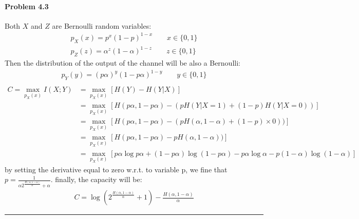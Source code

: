 \documentclass[12pt, letterpaper]{scrartcl}
\begin{document}
\paragraph*{Problem 4.3} \hfill\newline
Both $X$ and $Z$ are Bernoulli random variables:
\begin{align*}
    p_{X}(x)=p^x(1-p)^{1-x}\qquad x\in\{0,1\}\\
    p_{Z}(z)=\alpha^z(1-\alpha)^{1-z}\qquad z\in\{0,1\}
\end{align*}
Then the distribution of the output of the channel will be also a Bernoulli:
\begin{align*}
    p_{Y}(y)=(p\alpha)^y(1-p\alpha)^{1-y}\qquad y\in\{0,1\}\\
\end{align*}
\begin{align*}
    C=\max_{p_{X}(x)} I(X;Y)&=\max_{p_{X}(x)}[H(Y)-H(Y|X)]\\
    &=\max_{p_{X}(x)}[H(p\alpha, 1-p\alpha)-(pH(Y|X=1)+(1-p)H(Y|X=0))]\\
    &=\max_{p_{X}(x)}[H(p\alpha, 1-p\alpha)-(pH(\alpha,1-\alpha)+(1-p)\times0))]\\
    &=\max_{p_{X}(x)}[H(p\alpha, 1-p\alpha)-pH(\alpha,1-\alpha))]\\
    &=\max_{p_{X}(x)}[p\alpha\log p\alpha + (1-p\alpha)\log(1-p\alpha)-p\alpha\log\alpha -p(1-\alpha)\log(1-\alpha)]
\end{align*}
by setting the derivative equal to zero w.r.t. to variable p, we fine that $p=\frac{1}{\alpha2^{\frac{H(\alpha, 1-\alpha)}{\alpha}}+\alpha}$.
finally, the capacity will be:
\begin{align*}
    C=\log(2^{\frac{H(\alpha, 1-\alpha)}{\alpha}}+1)-\frac{H(\alpha, 1-\alpha)}{\alpha}
\end{align*}
\hrule
\end{document}
